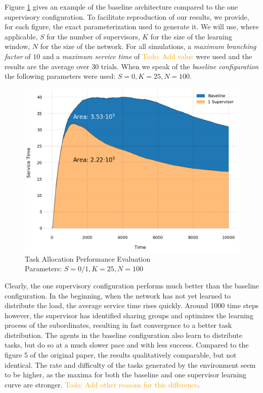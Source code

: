 \documentclass[letterpaper]{article}
\newcommand\todo[1]{\textcolor{orange}{Todo: #1}}
\begin{document}
Figure \ref{fig:areas} gives an example of the baseline architecture compared to the one supervisory configuration. To facilitate reproduction of our results, we provide, for each figure, the exact parameterization used to generate it. We will use, where applicable, $S$ for the number of supervisors, $K$ for the size of the learning window, $N$ for the size of the network. For all simulations, a \textit{maximum branching factor} of $10$ and a \textit{maximum service time} of \todo{Add value} were used and the results are the average over 30 trials. When we speak of the \textit{baseline configuration} the following parameters were used: $S=0,K=25,N=100$.
\begin{figure}[H]
 \begin{center}
  \includegraphics[width=\linewidth]{figures/figure5_light}
  \caption{Task Allocation Performance Evaluation\\Parameters: $S=0/1,K=25,N=100$}
  \label{fig:areas}
 \end{center}
\end{figure}

Clearly, the one supervisory configuration performs much better than the baseline configuration. In the beginning, when the network has not yet learned to distribute the load, the average service time rises quickly. Around 1000 time steps however, the supervisor has identified sharing groups and optimizes the learning process of the subordinates, resulting in fast convergence to a better task distribution. The agents in the baseline configuration also learn to distribute tasks, but do so at a much slower pace and with less success. Compared to the figure 5 of the original paper, the results qualitatively comparable, but not identical. The rate and difficulty of the tasks generated by the environment seem to be higher, as the maxima for both the baseline and one supervisor learning curve are stronger. \todo{Add other reasons for this difference}.
\end{document}
